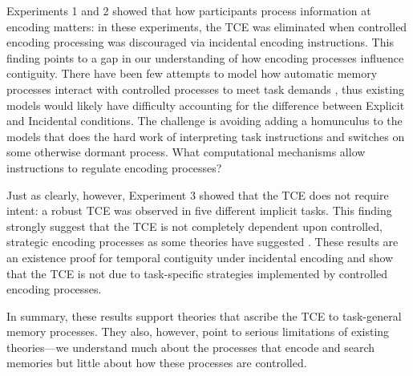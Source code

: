 \documentclass[man,natbib,floatsintext]{apa6} %
\begin{document}
Experiments 1 and 2 showed that how participants process information at encoding matters: in these experiments, the TCE was eliminated when controlled encoding processing was discouraged via incidental encoding instructions. This finding points to a gap in our understanding of how encoding processes influence contiguity. There have been few attempts to model how automatic memory processes interact with controlled processes to meet task demands \citep{LehmMalm13,PolyEtal09}, thus existing models would likely have difficulty accounting for the difference between Explicit and Incidental conditions. The challenge is avoiding adding a homunculus to the models that does the hard work of interpreting task instructions and switches on some otherwise dormant process. What computational mechanisms allow instructions to regulate encoding processes?

Just as clearly, however, Experiment 3 showed that the TCE does not require intent: a robust TCE was observed in five different implicit tasks. This finding strongly suggest that the TCE is not completely dependent upon controlled, strategic encoding processes as some theories have suggested \citep{Hint16}. These results are an existence proof for temporal contiguity under incidental encoding and show that the TCE is not due to task-specific strategies implemented by controlled encoding processes.

In summary, these results support theories that ascribe the TCE to task-general memory processes. They also, however, point to serious limitations of existing theories---we understand much about the processes that encode and search memories but little about how these processes are controlled.
\end{document}

